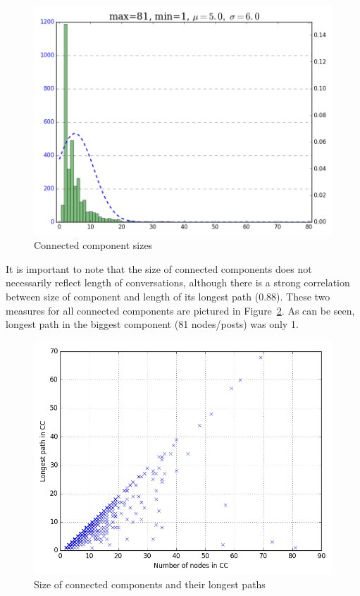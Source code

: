 \documentclass[sigconf]{acmart}
\begin{document}
\begin{figure}[htb]
\centering
\includegraphics[width=\columnwidth]{images/ccsizes.png}
\caption{Connected component sizes}
\label{fig:ccsizes}
\end{figure}

It is important to note that the size of connected components does not
necessarily reflect length of conversations, although there is a
strong correlation between size of component and length of its longest
path (0.88). These two measures for all connected components are
pictured in Figure~\ref{fig:ccsizepaths}. As can be seen, longest path
in the biggest component (81 nodes/posts) was only 1.

\begin{figure}[htb]
\centering
\includegraphics[width=\columnwidth]{images/ccsizepaths.png}
\caption{Size of connected components and their longest paths}
\label{fig:ccsizepaths}
\end{figure}
\end{document}
